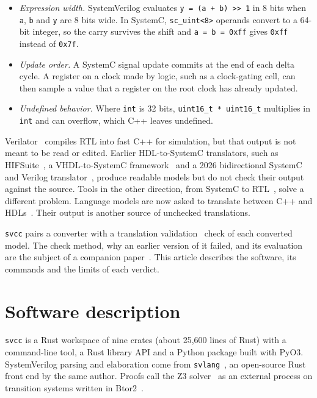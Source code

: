 \documentclass[preprint,12pt]{elsarticle}
\newcommand{\code}[1]{\texttt{#1}}
\begin{document}
\begin{itemize}
\item \emph{Expression width.} SystemVerilog evaluates \code{y = (a + b) >> 1} in 8 bits when
\code{a}, \code{b} and \code{y} are 8 bits wide. In SystemC, \code{sc\_uint<8>} operands convert to a 64-bit integer, so the carry survives
the shift and \code{a = b = 0xff} gives \code{0xff} instead of \code{0x7f}.
\item \emph{Update order.} A SystemC signal update commits at the end of each delta cycle. A
register on a clock made by logic, such as a clock-gating cell, can then sample a value that a
register on the root clock has already updated.
\item \emph{Undefined behavior.} Where \code{int} is 32 bits, \code{uint16\_t * uint16\_t}
multiplies in \code{int} and can overflow, which C++ leaves undefined.
\end{itemize}

Verilator~\cite{snyder2020verilator} compiles RTL into fast C++ for simulation, but that output is
not meant to be read or edited. Earlier HDL-to-SystemC translators, such as
HIFSuite~\cite{bombieri2010hifsuite}, a VHDL-to-SystemC framework~\cite{syed2013vhdl2sc} and a
2026 bidirectional SystemC and Verilog translator~\cite{zheng2026bidir}, produce readable models
but do not check their output against the source. Tools in the other direction, from SystemC to
RTL~\cite{wu2023sccl,moiseev2019icsc}, solve a different problem. Language models are now asked to
translate between C++ and HDLs~\cite{collini2024c2hlsc,lyu2026autoc2v}. Their output is another
source of unchecked translations.

\code{svcc} pairs a converter with a translation validation~\cite{pnueli1998tv,necula2000tv} check
of each converted model. The check method, why an earlier version of it failed, and its evaluation
are the subject of a companion paper~\cite{kubavat2026rtltv}. This article describes the software,
its commands and the limits of each verdict.

\section{Software description}
\label{sec:description}

\code{svcc} is a Rust workspace of nine crates (about 25,600 lines of Rust) with a command-line tool, a
Rust library API and a Python package built with PyO3. SystemVerilog parsing and elaboration come
from \code{svlang}~\cite{kubavat2026svlang}, an open-source Rust front end by the same author. Proofs
call the Z3 solver~\cite{demoura2008z3} as an external process on transition systems written in
Btor2~\cite{niemetz2018btor2}.
\end{document}

